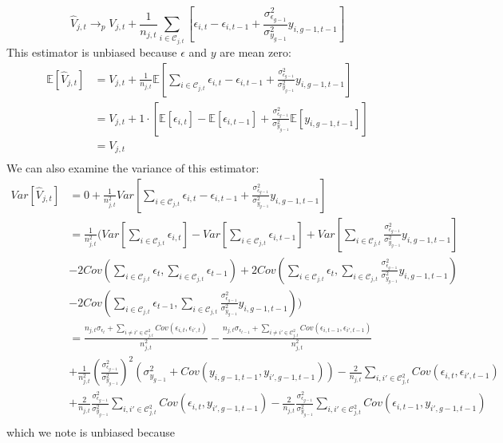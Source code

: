 \documentclass{article}
\theoremstyle{definition}
\theoremstyle{definition}
\begin{document}
\[
\hat{V}_{j,t} \to_p V_{j,t}  +  \frac{1}{n_{j,t}}\sum_{i \in \mathcal{C}_{j,t}}  \left [\epsilon_{i,t} - \epsilon_{i,t-1} + \frac{\sigma^2_{\epsilon_{g-1}}}{\sigma^2_{y_{g-1}}}   y_{i,g-1,t-1} \right ] 
\]
\noindent This estimator is unbiased because $\epsilon$ and $y$ are mean zero:
\begin{align*}
\mathbb{E}[\hat{V}_{j,t}] &= V_{j,t} +  \frac{1}{n_{j,t}}\mathbb{E} \left [ \sum_{i \in \mathcal{C}_{j,t}} \epsilon_{i,t} - \epsilon_{i,t-1} + \frac{\sigma^2_{\epsilon_{g-1}}}{\sigma^2_{y_{g-1}}}   y_{i,g-1,t-1} \right ] \\
                        & = V_{j,t} + 1 \cdot \left [ \mathbb{E}[\epsilon_{i,t}]   - \mathbb{E}[\epsilon_{i,t-1} ] + \frac{\sigma^2_{\epsilon_{g-1}}}{\sigma^2_{y_{g-1}}}\mathbb{E}[ y_{i,g-1,t-1}]  \right ] \\
& = V_{j,t} \\
\end{align*}
We can also examine the variance of this estimator:
\begin{align*}
 Var[\hat{V}_{j,t}] &= 0 + \frac{1}{n_{j,t}^2} Var \left [ \sum_{i \in \mathcal{C}_{j,t}}  \epsilon_{i,t} - \epsilon_{i,t-1} + \frac{\sigma^2_{\epsilon_{g-1}}}{\sigma^2_{y_{g-1}}}   y_{i,g-1,t-1} \right ] \\
            &= \frac{1}{n_{j,t}^2}  \Bigg ( Var \left [ \sum_{i \in \mathcal{C}_{j,t}}  \epsilon_{i,t}\right ]  - Var \left [\sum_{i \in \mathcal{C}_{j,t}}  \epsilon_{i,t-1}\right ] + Var \left [ \sum_{i \in \mathcal{C}_{j,t}} \frac{\sigma^2_{\epsilon_{g-1}}}{\sigma^2_{y_{g-1}}}   y_{i,g-1,t-1} \right ] \\
            &- 2Cov(\sum_{i \in \mathcal{C}_{j,t}} \epsilon_t, \sum_{i \in \mathcal{C}_{j,t}} \epsilon_{t-1}) + 2Cov(\sum_{i \in \mathcal{C}_{j,t}} \epsilon_t, \sum_{i \in \mathcal{C}_{j,t}} \frac{\sigma^2_{\epsilon_{g-1}}}{\sigma^2_{y_{g-1}}}   y_{i,g-1,t-1})\\ 
            &- 2Cov(\sum_{i \in \mathcal{C}_{j,t}} \epsilon_{t-1}, \sum_{i \in \mathcal{C}_{j,t}} \frac{\sigma^2_{\epsilon_{g-1}}}{\sigma^2_{y_{g-1}}}   y_{i,g-1,t-1}) \Bigg ) \\
            &= \frac{n_{j,t}\sigma_{\epsilon_t}+\sum_{i \neq i' \in \mathcal{C}_{j,t}^2} Cov(\epsilon_{i,t},\epsilon_{i',t})}{n^2_{j,t}} -  \frac{n_{j,t}\sigma_{\epsilon_{t-1}}+\sum_{i \neq i' \in \mathcal{C}_{j,t}^2} Cov(\epsilon_{i,t-1},\epsilon_{i',t-1})}{n^2_{j,t}}  \\
            &+\frac{1}{n^2_{j,t}} \left(\frac{\sigma^2_{\epsilon_{g-1}}}{\sigma^2_{y_{g-1}}} \right) ^2 \left ( \sigma^2_{y_{g-1}} + Cov( y_{i,g-1,t-1}, y_{i',g-1,t-1})\right ) - \frac{2}{n_{j,t}} \sum_{i,i' \in \mathcal{C}_{j,t}^2} Cov(\epsilon_{i,t}, \epsilon_{i',t-1})\\ &+\frac{2}{n_{j,t}}\frac{\sigma^2_{\epsilon_{g-1}}}{\sigma^2_{y_{g-1}}} \sum_{i,i' \in \mathcal{C}_{j,t}^2}Cov( \epsilon_{i,t},  y_{i',g-1,t-1}) -\frac{2}{n_{j,t}}\frac{\sigma^2_{\epsilon_{g-1}}}{\sigma^2_{y_{g-1}}} \sum_{i,i' \in \mathcal{C}_{j,t}^2}Cov( \epsilon_{i,t-1},  y_{i',g-1,t-1})\\ 
\end{align*}
\noindent which we note is unbiased because 
\end{document}
